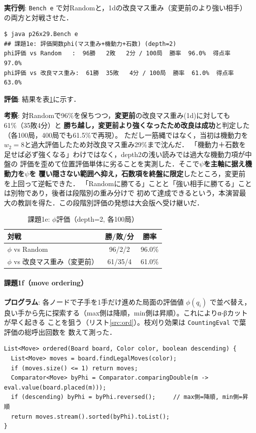 \documentclass[11pt,a4j]{ujarticle} %
\begin{document}
\textbf{実行例}: {\verb+Bench e+} で対Randomと，1dの改良マス重み（変更前のより強い相手）の両方と対戦させた．
\begin{lstlisting}[caption=課題1eの実行例,label=ex:1e]
$ java p26x29.Bench e
## 課題1e: 評価関数phi(マス重み+機動力+石数) (depth=2)
phi評価 vs Random   :  96勝   2敗   2分 / 100局  勝率  96.0%  得点率  97.0%
phi評価 vs 改良マス重み:  61勝  35敗   4分 / 100局  勝率  61.0%  得点率  63.0%
\end{lstlisting}

\textbf{評価}: 結果を表\ref{tab:1e}に示す．

\textbf{考察}: 対Randomで96\%を保ちつつ，\textbf{変更前}の改良マス重み(1d)に対しても61\%（35敗4分）と
\textbf{勝ち越し，変更前より強くなったため改良は成功}と判定した（各100局，400局でも61.5\%で再現）。
ただし一筋縄ではなく，当初は機動力を$w_2=8$と過大評価したため対改良マス重み29\%まで沈んだ．
「機動力＋石数を足せば必ず強くなる」わけではなく，depth2の浅い読みでは過大な機動力項が中盤の
評価を歪めて位置評価単体に劣ることを実測した．そこで\textbf{$\psi$を主軸に据え機動力を$\psi$を
覆い隠さない範囲へ抑え，石数項を終盤に限定}したところ，変更前を上回って逆転できた．
「Randomに勝てる」ことと「強い相手に勝てる」ことは別物であり，後者は段階別の重み分けで
初めて達成できるという，本演習最大の教訓を得た．この段階別評価の発想は大会版へ受け継いだ．

\begin{table}[h]\center
\caption{課題1e: $\phi$評価（depth=2, 各100局）}\label{tab:1e}
\begin{tabular}{l|c|c}
対戦 & 勝/敗/分 & 勝率 \\ \hline\hline
$\phi$ vs Random & 96/2/2 & 96.0\% \\
$\phi$ vs 改良マス重み（変更前）& 61/35/4 & 61.0\% \\
\end{tabular}
\end{table}

\paragraph{課題1f（move ordering）}
\textbf{プログラム}: 各ノードで子手を1手だけ進めた局面の評価値 $\phi(q_i)$ で並べ替え，
良い手から先に探索する（max側は降順，min側は昇順）。これによりα-βカットが早く起きる
ことを狙う（リスト\ref{src:ord}）。枝刈り効果は {\verb+CountingEval+} で葉評価の総呼出回数を
数えて測った．
\begin{lstlisting}[caption=1手読み評価で整列（OrderingPlayer\#ordered）,label=src:ord]
List<Move> ordered(Board board, Color color, boolean descending) {
  List<Move> moves = board.findLegalMoves(color);
  if (moves.size() <= 1) return moves;
  Comparator<Move> byPhi = Comparator.comparingDouble(m -> eval.value(board.placed(m)));
  if (descending) byPhi = byPhi.reversed();     // max側=降順, min側=昇順
  return moves.stream().sorted(byPhi).toList();
}
\end{lstlisting}
\end{document}
